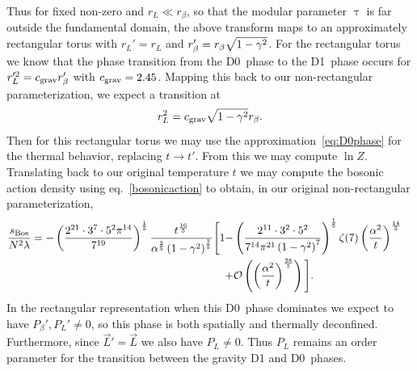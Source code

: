 Thus for fixed non-zero \ga and $r_L \ll r_{\beta}$, so that the modular parameter $\uptau$ is far outside the fundamental domain, the above transform maps to an approximately rectangular torus with $r_L' = r_L$ and $r_{\beta}' = r_{\beta} \sqrt{1 - \gamma^2}$.
For the rectangular torus we know that the phase transition from the D0~phase to the D1~phase occurs for $r_L'^2 = c_{\text{grav}} r_{\beta}'$ with $c_{\text{grav}} = 2.45$.
Mapping this back to our non-rectangular parameterization, we expect a transition at
\begin{equation}
  \label{eq:skewtransition}
  r_L^2 = c_{\text{grav}} \sqrt{1 - \gamma^2} r_{\beta}.
\end{equation}
Then for this rectangular torus we may use the approximation~\eqref{eq:D0phase} for the thermal behavior, replacing $t \to t'$.
From this we may compute $\ln Z$.
Translating back to our original temperature $t$ we may compute the bosonic action density using eq.~\eqref{bosonicaction} to obtain, in our original non-rectangular parameterization,
\begin{align}
  \label{eq:skewD0phase}
  \frac{s_{\text{Bos}}}{N^2 \lambda} = -\left(\frac{2^{21} \cdot 3^7 \cdot 5^2 \pi^{14}}{7^{19}}\right)^{\frac{1}{5}} \frac{t^{\frac{16}{5}}}{\alpha^{\frac{2}{5}} \left(1 - \gamma^2\right)^{\frac{7}{5}}} \Bigg[1 - & \left(\frac{2^{11} \cdot 3^2 \cdot 5^2}{7^{14} \pi^{21} \left(1 - \gamma^2\right)^7}\right)^{\frac{1}{5}} \zeta(7) \left(\frac{\alpha^2}{t}\right)^{\frac{14}{5}} \cr
  + & \mathcal O\left(\left(\frac{\alpha^2}{t}\right)^{\frac{28}{5}}\right)\Bigg].
\end{align}
In the rectangular representation when this D0~phase dominates we expect to have $P_{\beta}', P_L' \ne 0$, so this phase is both spatially and thermally deconfined.
Furthermore, since $\vec{L}' = \vec{L}$ we also have $P_L \ne 0$.
Thus $P_L$ remains an order parameter for the transition between the gravity D1 and D0~phases.

